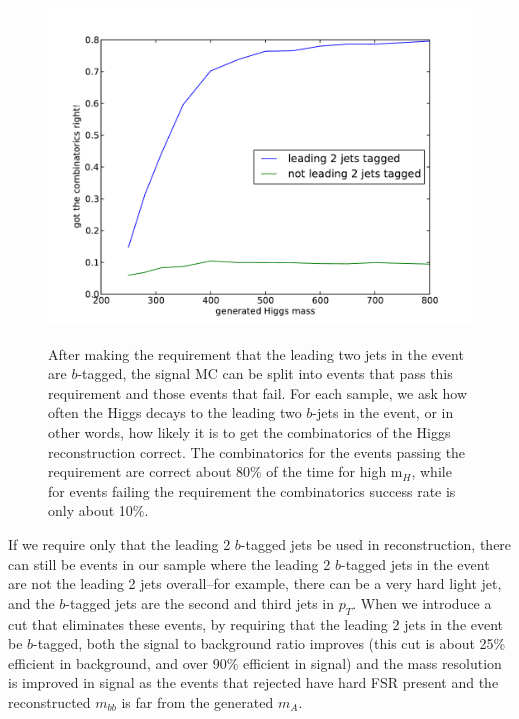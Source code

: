 \begin{figure}
  \centering
    \includegraphics[width=0.78\linewidth]{SignalKin/combinatorics_success.pdf}
    \label{fig:combinatorics_success}
    \caption{After making the requirement that the leading two jets in the event are $b$-tagged,
    the signal MC can be split into events that pass this requirement and those events that fail.
    For each sample, we ask how often the Higgs decays to the leading two $b$-jets in the event,
    or in other words, how likely it is to get the combinatorics of the Higgs reconstruction correct.
    The combinatorics for the events passing the requirement are correct about 80\% of the time for
    high m$_H$, while for events failing the requirement the combinatorics success rate is only about 10\%.}
\end{figure}
                                                                                                                                                                 
                                                                                                                                    
If we require only that the leading 2 $b$-tagged jets be used in reconstruction, there can                                          
still be events in our sample where the leading 2 $b$-tagged jets in the event are not                                              
the leading 2 jets overall--for example, there can be a very hard light jet, and the $b$-tagged                                     
jets are the second and third jets in $p_T$.  When we introduce a cut that eliminates these events,                                 
by requiring that the leading 2 jets in the event be $b$-tagged, both the signal to background                                      
ratio improves (this cut is about 25\% efficient in background, and over 90\% efficient                                             
in signal) and the mass resolution is improved in signal as the events that rejected have                                           
hard FSR present and the reconstructed $m_{bb}$ is far from the generated $m_A$.    




